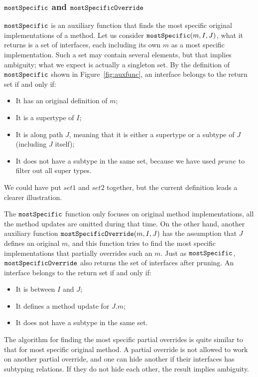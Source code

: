 \subsubsection{$\texttt{mostSpecific}$ and $\texttt{mostSpecificOverride}$}

$\texttt{mostSpecific}$ is an auxiliary function that finds the most specific original implementations of a method. Let us consider $\texttt{mostSpecific}(m, I, J)$, what it returns is a set of interfaces, each including its own $m$ as a most specific implementation. Such a set may contain several elements, but that implies ambiguity; what we expect is actually a singleton set. By the definition of $\texttt{mostSpecific}$ shown in Figure~\ref{fig:auxfunc}, an interface belongs to the return set if and only if:
\begin{itemize}
	\item It has an original definition of $m$;
	\item It is a supertype of $I$;
	\item It is along path $J$, meaning that it is either a supertype or a subtype of $J$ (including $J$ itself);
	\item It does not have a subtype in the same set, because we have used $prune$ to filter out all super types.
\end{itemize}
We could have put $set1$ and $set2$ together, but the current definition leads a clearer illustration.

The $\texttt{mostSpecific}$ function only focuses on original method implementations, all the method updates are omitted during that time. On the other hand, another auxiliary function $\texttt{mostSpecificOverride}(m, I, J)$ has the assumption that $J$ defines an original $m$, and this function tries to find the most specific implementations that partially overrides such an $m$. Just as $\texttt{mostSpecific}$, $\texttt{mostSpecificOverride}$ also returns the set of interfaces after pruning. An interface belongs to the return set if and only if:
\begin{itemize}
	\item It is between $I$ and $J$;
	\item It defines a method update for $J.m$;
	\item It does not have a subtype in the same set.
\end{itemize}
The algorithm for finding the most specific partial overrides is quite similar to that for most specific original method. A partial override is not allowed to work on another partial override, and one can hide another if their interfaces has subtyping relations. If they do not hide each other, the result implies ambiguity.

